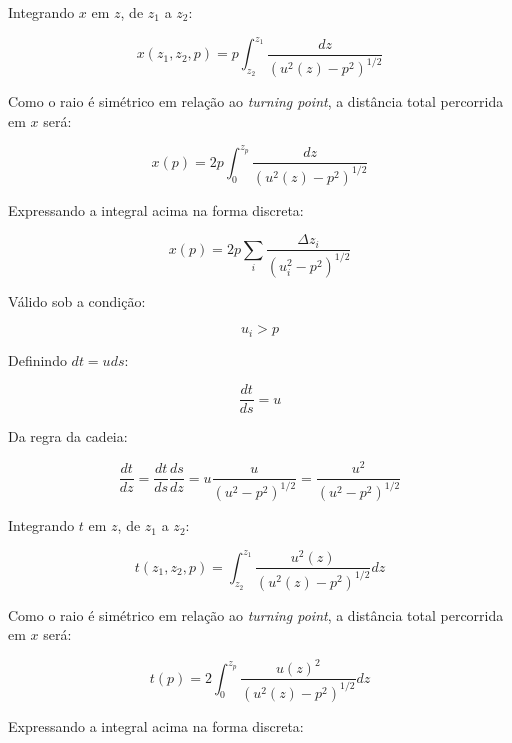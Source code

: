 \documentclass[a4paper, 12pt]{article}
\begin{document}
Integrando $x$ em $z$, de $z_1$ a $z_2$:

\begin{equation}
 \label{eq:1.14}
 x(z_1,z_2,p)=p\int^{z_1}_{z_2} \frac{dz}{(u^2(z)-p^2)^{1/2}}
\end{equation}

Como o raio é simétrico em relação ao \textit{turning point}, a distância total percorrida em $x$ será:

\begin{equation}
 \label{eq:1.15}
 x(p)=2p\int^{z_p}_{0} \frac{dz}{(u^2(z)-p^2)^{1/2}}
\end{equation}

Expressando a integral acima na forma discreta:

\begin{equation}
 \label{eq:1.16}
 x(p)=2p\sum_i \frac{\Delta z_i}{(u^2_i-p^2)^{1/2}}
\end{equation}

Válido sob a condição:

\begin{equation}
\label{eq:1.17}
u_i > p
\end{equation}

Definindo $dt=u ds$:

\begin{equation}
 \label{eq:1.18}
 \frac{dt}{ds}=u
\end{equation}

Da regra da cadeia:

\begin{equation}
 \label{eq:1.19}
 \frac{dt}{dz} = \frac{dt}{ds} \frac{ds}{dz} = u \frac{u}{(u^2-p^2)^{1/2}} = \frac{u^2}{(u^2-p^2)^{1/2}}
\end{equation}

Integrando $t$ em $z$, de $z_1$ a $z_2$:

\begin{equation}
 \label{eq:1.20}
 t(z_1,z_2,p)=\int^{z_1}_{z_2} \frac{u^2(z)}{(u^2(z)-p^2)^{1/2}} dz
\end{equation}

Como o raio é simétrico em relação ao \textit{turning point}, a distância total percorrida em $x$ será:

\begin{equation}
 \label{eq:1.21}
 t(p)=2\int^{z_p}_{0} \frac{u(z)^2}{(u^2(z)-p^2)^{1/2}} dz
\end{equation}

Expressando a integral acima na forma discreta:
\end{document}
